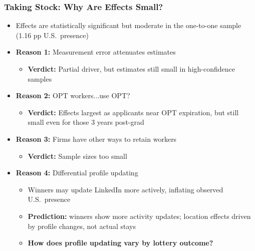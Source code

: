 \documentclass[xcolor=dvipsnames, compress, 12pt, aspectratio=169, presentation]{beamer}
\begin{document}
\begin{frame}
    \frametitle{Taking Stock: Why Are Effects Small?}
    \begin{itemize}\itemsep1mm
        \item Effects are statistically significant but moderate in the one-to-one sample (1.16 pp U.S.\ presence)
        \item \textbf{Reason 1:} Measurement error attenuates estimates
        \begin{itemize}
            \item \textbf{Verdict:} Partial driver, but estimates still small in high-confidence samples
        \end{itemize}
        \item \textbf{Reason 2:} OPT workers...use OPT?
        \begin{itemize}
            \item \textbf{Verdict:} Effects largest as applicants near OPT expiration, but still small even for those 3 years post-grad
        \end{itemize}
        \item \textbf{Reason 3:} Firms have other ways to retain workers
        \begin{itemize}
            \item \textbf{Verdict:} Sample sizes too small
        \end{itemize}
        \item \textbf{Reason 4:} Differential profile updating
        \begin{itemize}
            \item Winners may update LinkedIn more actively, inflating observed U.S.\ presence
            \item \textbf{Prediction:} winners show more activity updates; location effects driven by profile changes, not actual stays
            \item \textbf{How does profile updating vary by lottery outcome?}
        \end{itemize}
    \end{itemize}
\end{frame}
\end{document}
